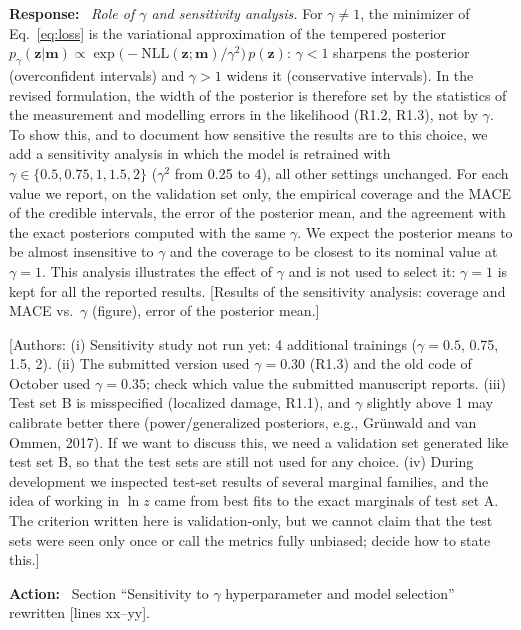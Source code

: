 \documentclass[11pt]{article}
\newenvironment{response}{\par\smallskip\noindent\color{resp}\textbf{Response:}\ }{\par}
\newenvironment{action}{\par\smallskip\noindent\color{resp}\textbf{Action:}\ }{\par}
\newcommand{\authornote}[1]{\textcolor{note}{\textsf{[Authors: #1]}}}
\newcommand{\tbd}[1]{\textcolor{note}{\textsf{[#1]}}}
\newcommand{\lines}[1]{\tbd{lines #1}}
\newcommand{\m}{\mathbf{m}}
\newcommand{\z}{\mathbf{z}}
\begin{document}
\begin{response}
\textit{Role of $\gamma$ and sensitivity analysis.} For $\gamma\neq1$, the minimizer of Eq.~\eqref{eq:loss} is the
variational approximation of the tempered posterior $p_\gamma(\z|\m)\propto\exp\big(-\mathrm{NLL}(\z;\m)/\gamma^2\big)\,
p(\z)$: $\gamma<1$ sharpens the posterior (overconfident intervals) and $\gamma>1$ widens it (conservative intervals).
In the revised formulation, the width of the posterior is therefore set by the statistics of the measurement and
modelling errors in the likelihood (R1.2, R1.3), not by $\gamma$. To show this, and to document how sensitive the
results are to this choice, we add a sensitivity analysis in which the model is retrained with
$\gamma\in\{0.5,0.75,1,1.5,2\}$ ($\gamma^2$ from 0.25 to 4), all other settings unchanged. For each value we report,
on the validation set only, the empirical coverage and the MACE of the credible intervals, the error of the posterior
mean, and the agreement with the exact posteriors computed with the same $\gamma$. We expect the posterior means to be
almost insensitive to $\gamma$ and the coverage to be closest to its nominal value at $\gamma=1$. This analysis
illustrates the effect of $\gamma$ and is not used to select it: $\gamma=1$ is kept for all the reported results.
\tbd{Results of the sensitivity analysis: coverage and MACE vs.\ $\gamma$ (figure), error of the posterior mean.}
\end{response}
\authornote{(i) Sensitivity study not run yet: 4 additional trainings ($\gamma=0.5$, 0.75, 1.5, 2). (ii) The submitted
version used $\gamma=0.30$ (R1.3) and the old code of October used $\gamma=0.35$; check which value the submitted manuscript
reports. (iii) Test set B is misspecified (localized damage, R1.1), and $\gamma$ slightly above 1 may calibrate better
there (power/generalized posteriors, e.g., Gr\"unwald and van Ommen, 2017). If we want to discuss this, we need a
validation set generated like test set B, so that the test sets are still not used for any choice. (iv) During
development we inspected test-set results of several marginal families, and the idea of working in $\ln z$ came from best
fits to the exact marginals of test set A. The criterion written here is validation-only, but we cannot claim that the
test sets were seen only once or call the metrics fully unbiased; decide how to state this.}

\begin{action}
Section ``Sensitivity to $\gamma$ hyperparameter and model selection'' rewritten \lines{xx--yy}.
\end{action}
\end{document}
